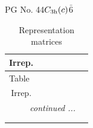 \documentclass[fleqn,8pt,landscape]{jsarticle}
\begin{document}
\setcounter{MaxMatrixCols}{32}

\renewcommand{\tablename}{Table~}
\renewcommand{\figurename}{Figure~}
\begin{center}
\LARGE
PG No. 44\quad$C_{\rm 3h}(c)$\quad$\bar{6}$\quad[ hexagonal ]
\end{center}
\renewcommand{\arraystretch}{1.2}
\begin{longtable}{ccccccc}
\caption{Representation matrices}
 \\
 \hline \hline
Irrep. &  &  &  &  &  &  \\ \hline \endfirsthead

\multicolumn{6}{l}{\tablename\ \thetable{}} \\
 \hline \hline
Irrep. &  &  &  &  &  &  \\ \hline \endhead

 \hline \hline
\multicolumn{6}{r}{\footnotesize\it continued ...} \\ \endfoot

 \hline \hline
\multicolumn{6}{r}{} \\ \endlastfoot


\end{longtable}
\end{document}
